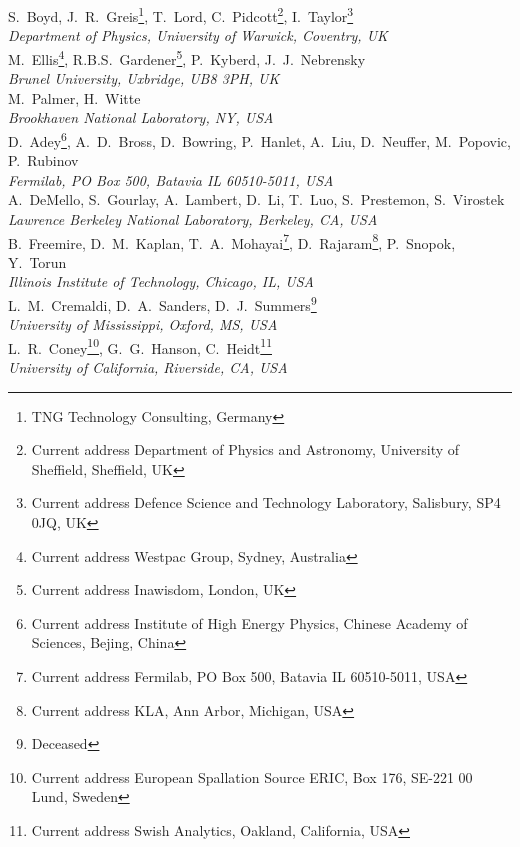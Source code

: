 S.~Boyd,  J.~R.~Greis\footnote{TNG Technology Consulting, Germany}, T.~Lord, C.~Pidcott\footnote{Current address Department of Physics and Astronomy, University of Sheffield, Sheffield, UK}, I.~Taylor\footnote{Current address Defence Science and Technology Laboratory, Salisbury, SP4 0JQ, UK}
\\{\it
Department of Physics, University of Warwick, Coventry, UK
}\\

M.~Ellis\footnote{Current address Westpac Group, Sydney, Australia}, R.B.S.~Gardener\footnote{Current address Inawisdom, London, UK}, P.~Kyberd, J.~J.~Nebrensky
\\{\it
Brunel University, Uxbridge, UB8 3PH, UK
}\\

M.~Palmer, H.~Witte
\\{\it
Brookhaven National Laboratory, NY, USA
}\\

D.~Adey\footnote{Current address Institute of High Energy Physics, Chinese Academy of Sciences, Bejing, China}, A.~D.~Bross, D.~Bowring, P.~Hanlet, A.~Liu\footnotemark{}\setcounter{FNEuclid}{\value{footnote}}, D.~Neuffer, M.~Popovic, P.~Rubinov
\\{\it
Fermilab, PO Box 500, Batavia IL 60510-5011, USA
}\\

A.~DeMello, S.~Gourlay, A.~Lambert, D.~Li, T.~Luo, S.~Prestemon,  S.~Virostek
\\{\it
Lawrence Berkeley National Laboratory, Berkeley, CA, USA
}\\

B.~Freemire\footnotemark[\value{FNEuclid}], D.~M.~Kaplan, T.~A.~Mohayai\footnote{Current address Fermilab, PO Box 500, Batavia IL 60510-5011, USA}, D.~Rajaram\footnote{Current address KLA, Ann Arbor, Michigan, USA}, P.~Snopok, Y.~Torun
\\{\it
Illinois Institute of Technology, Chicago, IL, USA
}\\

L.~M.~Cremaldi, D.~A.~Sanders, D.~J.~Summers\footnote{Deceased}
\\{\it
University of Mississippi, Oxford, MS, USA
}\\

L.~R.~Coney\footnote{Current address European Spallation Source ERIC, Box 176, SE-221 00 Lund, Sweden}, G.~G.~Hanson, C.~Heidt\footnote{Current address Swish Analytics, Oakland, California, USA}
\\{\it
University of California, Riverside, CA, USA
}\\
